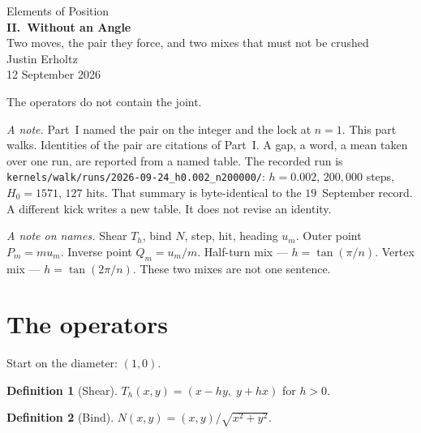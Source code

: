 \documentclass[10pt,a4paper]{article}
\theoremstyle{plain}
\theoremstyle{definition}
\newtheorem{definition}{Definition}
\theoremstyle{remark}
\begin{document}
\begin{center}
\vspace*{2.0em}
{\large Elements of Position}\\[1.5em]
{\LARGE\bfseries II.\ Without an Angle}\\[0.5em]
{\small Two moves, the pair they force, and two mixes that must not be crushed}\\[1.6em]
{\normalsize Justin Erholtz}\\[0.3em]
{\small 12 September 2026}
\end{center}

\vspace{1.2em}

\begin{center}
{\large The operators do not contain the joint.}
\end{center}

\vspace{1.0em}

\noindent
\textit{A note.}
Part~I named the pair on the integer and the lock at \(n=1\).
This part walks.
Identities of the pair are citations of Part~I.
A gap, a word, a mean taken over one run, are reported from a named table.
The recorded run is
\texttt{kernels/walk/runs/2026-09-24\_h0.002\_n200000/}:
\(h=0.002\), \(200{,}000\) steps, \(H_0=1571\), \(127\) hits.
That summary is byte-identical to the \(19\)~September record.
A different kick writes a new table.
It does not revise an identity.

\vspace{0.5em}
\noindent
\textit{A note on names.}
Shear \(T_h\), bind \(N\), step, hit, heading \(u_m\).
Outer point \(P_m=m u_m\). Inverse point \(Q_m=u_m/m\).
Half-turn mix --- \(h=\tan(\pi/n)\).
Vertex mix --- \(h=\tan(2\pi/n)\).
These two mixes are not one sentence.

\tableofcontents

\section{The operators}

Start on the diameter: \((1,0)\).

\begin{definition}[Shear]
\(T_h(x,y)=(x-hy,\; y+hx)\) for \(h>0\).
\end{definition}

\begin{definition}[Bind]
\(N(x,y)=(x,y)/\sqrt{x^2+y^2}\).
\end{definition}
\end{document}

